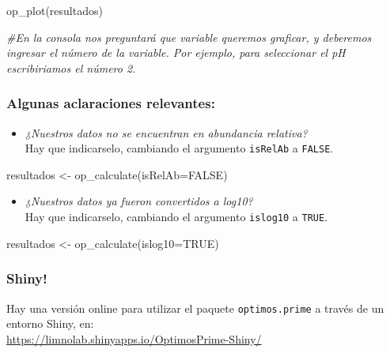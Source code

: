 \documentclass[
]{book}
\newenvironment{Shaded}{\begin{snugshade}}{\end{snugshade}}
\newcommand{\AttributeTok}[1]{\textcolor[rgb]{0.77,0.63,0.00}{#1}}
\newcommand{\CommentTok}[1]{\textcolor[rgb]{0.56,0.35,0.01}{\textit{#1}}}
\newcommand{\ConstantTok}[1]{\textcolor[rgb]{0.00,0.00,0.00}{#1}}
\newcommand{\FunctionTok}[1]{\textcolor[rgb]{0.00,0.00,0.00}{#1}}
\newcommand{\NormalTok}[1]{#1}
\newcommand{\OtherTok}[1]{\textcolor[rgb]{0.56,0.35,0.01}{#1}}
\providecommand{\tightlist}{%
  \setlength{\itemsep}{0pt}\setlength{\parskip}{0pt}}
\begin{document}
\begin{Shaded}
\begin{Highlighting}[]
\FunctionTok{op\_plot}\NormalTok{(resultados)}

\CommentTok{\#En la consola nos preguntará que variable queremos graficar, y deberemos ingresar el número de la variable. Por ejemplo, para seleccionar el pH escribiriamos el número 2.}
\end{Highlighting}
\end{Shaded}

\hypertarget{algunas-aclaraciones-relevantes-1}{%
\subsubsection{\texorpdfstring{\textbf{Algunas aclaraciones relevantes:}}{Algunas aclaraciones relevantes:}}\label{algunas-aclaraciones-relevantes-1}}

\begin{itemize}
\tightlist
\item
  \emph{¿Nuestros datos no se encuentran en abundancia relativa?}\\
  Hay que indicarselo, cambiando el argumento \texttt{isRelAb} a \texttt{FALSE}.
\end{itemize}

\begin{Shaded}
\begin{Highlighting}[]
\NormalTok{resultados }\OtherTok{\textless{}{-}} \FunctionTok{op\_calculate}\NormalTok{(}\AttributeTok{isRelAb=}\ConstantTok{FALSE}\NormalTok{)}
\end{Highlighting}
\end{Shaded}

\begin{itemize}
\tightlist
\item
  \emph{¿Nuestros datos ya fueron convertidos a log10?}\\
  Hay que indicarselo, cambiando el argumento \texttt{islog10} a \texttt{TRUE}.
\end{itemize}

\begin{Shaded}
\begin{Highlighting}[]
\NormalTok{resultados }\OtherTok{\textless{}{-}} \FunctionTok{op\_calculate}\NormalTok{(}\AttributeTok{islog10=}\ConstantTok{TRUE}\NormalTok{)}
\end{Highlighting}
\end{Shaded}

\hypertarget{shiny-1}{%
\subsubsection{Shiny!}\label{shiny-1}}

Hay una versión online para utilizar el paquete \texttt{optimos.prime} a través de un entorno Shiny, en:\\
\url{https://limnolab.shinyapps.io/OptimosPrime-Shiny/}

  
\end{document}
